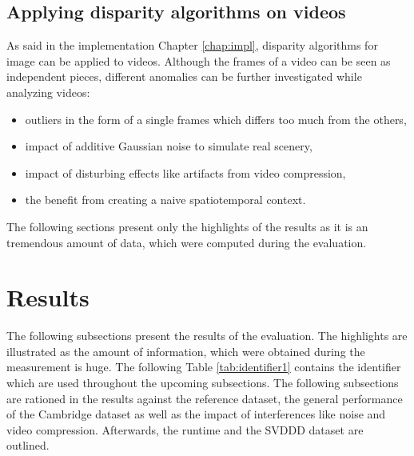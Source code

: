 \subsection*{Applying disparity algorithms on videos}

As said in the implementation Chapter \ref{chap:impl}, disparity algorithms for image can be applied to videos.
Although the frames of a video can be seen as independent pieces, different anomalies can be further investigated while analyzing videos:

\begin{itemize}
  \item outliers in the form of a single frames which differs too much from the others,
  \item impact of additive Gaussian noise to simulate real scenery,
  \item impact of disturbing effects like artifacts from video compression,
  \item the benefit from creating a naive spatiotemporal context.
\end{itemize}

\noindent The following sections present only the highlights of the results as it is an tremendous amount of data, which were computed during the evaluation.

\section{Results}

The following subsections present the results of the evaluation.
The highlights are illustrated as the amount of information, which were obtained during the measurement is huge.
The following Table \ref{tab:identifier1} contains the identifier which are used throughout the upcoming subsections.
The following subsections are rationed in the results against the reference dataset, the general performance of the Cambridge dataset as well as the impact of interferences like noise and video compression.
Afterwards, the runtime and the SVDDD dataset are outlined.

